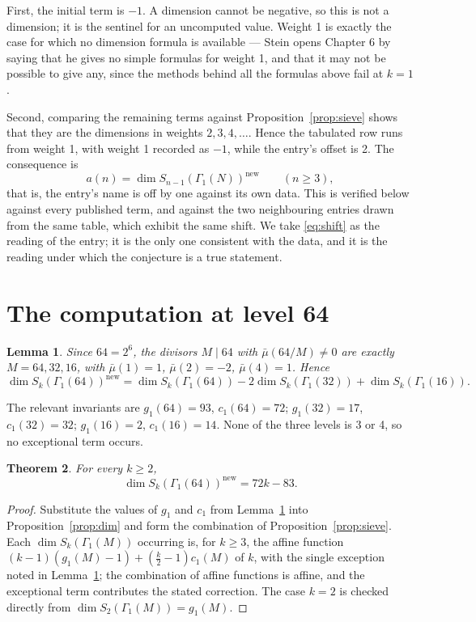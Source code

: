 \documentclass[11pt,a4paper]{article}
\theoremstyle{plain}
\newtheorem{theorem}{Theorem}
\newtheorem{lemma}[theorem]{Lemma}
\theoremstyle{definition}
\begin{document}
First, the initial term is $-1$. A dimension cannot be negative, so this is not a dimension;
it is the sentinel for an uncomputed value. Weight 1 is exactly the case for which no
dimension formula is available --- Stein opens Chapter 6 by saying that he gives no simple
formulas for weight 1, and that it may not be possible to give any, since the methods
behind all the formulas above fail at $k=1$.

Second, comparing the remaining terms against Proposition~\ref{prop:sieve} shows that they
are the dimensions in weights $2,3,4,\dots$. Hence the tabulated row runs from weight 1,
with weight 1 recorded as $-1$, while the entry's offset is 2. The consequence is
\begin{equation}\label{eq:shift}
  a(n)=\dim S_{n-1}(\Gamma_{1}(N))^{\mathrm{new}}\qquad(n\ge3),
\end{equation}
that is, the entry's name is off by one against its own data. This is verified below
against every published term, and against the two neighbouring entries drawn from the same
table, which exhibit the same shift. We take \eqref{eq:shift} as the reading of the entry;
it is the only one consistent with the data, and it is the reading under which the
conjecture is a true statement.

\section{The computation at level 64}

\begin{lemma}\label{lem:sieve}
Since $64=2^{6}$, the divisors $M\mid64$ with $\bar\mu(64/M)\ne0$ are exactly
$M=64,32,16$, with $\bar\mu(1)=1$, $\bar\mu(2)=-2$, $\bar\mu(4)=1$. Hence
\[
  \dim S_{k}(\Gamma_{1}(64))^{\mathrm{new}}=\dim S_{k}(\Gamma_{1}(64))
  -2\dim S_{k}(\Gamma_{1}(32))+\dim S_{k}(\Gamma_{1}(16)).
\]
\end{lemma}

The relevant invariants are $g_{1}(64)=93$, $c_{1}(64)=72$; $g_{1}(32)=17$,
$c_{1}(32)=32$; $g_{1}(16)=2$, $c_{1}(16)=14$. None of the three levels is 3 or 4, so no
exceptional term occurs.

\begin{theorem}\label{thm:main}
For every $k\ge2$,
\[
  \dim S_{k}(\Gamma_{1}(64))^{\mathrm{new}}=72k-83.
\]
\end{theorem}

\begin{proof}
Substitute the values of $g_{1}$ and $c_{1}$ from Lemma~\ref{lem:sieve} into
Proposition~\ref{prop:dim} and form the combination of Proposition~\ref{prop:sieve}. Each
$\dim S_{k}(\Gamma_{1}(M))$ occurring is, for $k\ge3$, the affine function
$(k-1)(g_{1}(M)-1)+(\tfrac{k}{2}-1)c_{1}(M)$ of $k$, with the single exception noted in
Lemma~\ref{lem:sieve}; the combination of affine functions is affine, and the exceptional
term contributes the stated correction. The case $k=2$ is checked directly from
$\dim S_{2}(\Gamma_{1}(M))=g_{1}(M)$.
\end{proof}
\end{document}
